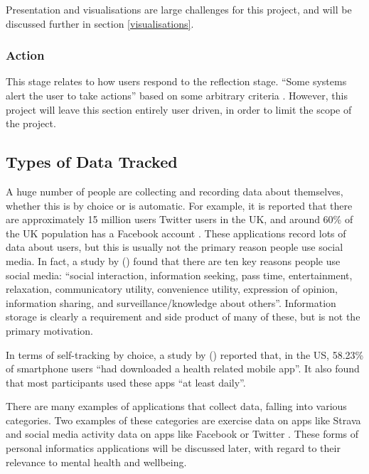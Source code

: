 \documentclass[11pt,openright,a4paper]{report}
\begin{document}
Presentation and visualisations are large challenges for this project, and will be discussed further in section \ref{visualisations}.

\subsubsection{Action}
This stage relates to how users respond to the reflection stage. \enquote{Some systems alert the user to take
actions} based on some arbitrary criteria \parencite{li2010stage}. However, this project will leave this section entirely user driven, in order to limit the scope of the project.

\subsection{Types of Data Tracked}
A huge number of people are collecting and recording data about themselves, whether this is by choice or is automatic. For example, it is reported that there are approximately 15 million users Twitter users in the UK, and around 60\% of the UK population has a Facebook account \parencite{smdemographics}. These applications record lots of data about users, but this is usually not the primary reason people use social media. In fact, a study by \citeauthor{whiting2013people} (\citeyear{whiting2013people}) found that there are ten key reasons people use social media: \enquote{social interaction, information seeking, pass time, entertainment, relaxation,
communicatory utility, convenience utility, expression of opinion, information sharing, and
surveillance/knowledge about others}. Information storage is clearly a requirement and side product of many of these, but is not the primary motivation.

In terms of self-tracking by choice, a study by \citeauthor{krebs2015health} (\citeyear{krebs2015health}) reported that, in the US, 58.23\% of smartphone users \enquote{had downloaded a health related mobile app}. It also found that most participants used these apps \enquote{at least daily}.

There are many examples of applications that collect data, falling into various categories. Two examples of these categories are exercise data on apps like Strava \parencite{strava} and social media activity data on apps like Facebook \parencite{facebook} or Twitter \parencite{twitter}. These forms of personal informatics applications will be discussed later, with regard to their relevance to mental health and wellbeing.
\end{document}
